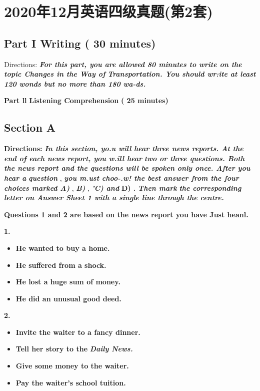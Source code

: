 \documentclass[UTF8,11pt]{ctexart}
\begin{document}
\section*{2020年12月英语四级真题(第2套)}
\subsection*{\textbf{Part I} \textbf{Writing} \textbf{( 30 minutes)}}


Directions: \textbf{\textit{For this part, you are allowed 80 minutes to write on the topic Changes in the Way of}} \textbf{\textit{Transportation. You should wr:ite at least 120 wonds but no more than 180 wa-ds.}}


\textbf{Part ll} \textbf{Listening Comprehension} \textbf{( 25 minutes)}


\subsection*{Section A}


\textbf{Directions: }\textbf{\textit{In this section, yo.u will hear three news reports. At the end of each news report, you w.ill hear}} \textbf{\textit{two or three questions. Both the news report and the questions will be spoken only once. After you hear a}} \textbf{\textit{question }}, \textbf{\textit{you m.ust choo-.w! the best answer from the four choices marked A) }}, \textbf{\textit{B) }}, \textbf{\textit{'C) and }}\textbf{D) . }\textbf{\textit{Then mark}} \textbf{\textit{the corresponding letter on Answer Sheet 1 with a single line through the centre.}}


\textbf{Questions 1 and 2 are based on the news report you have Just heanl.}


\textbf{1.}


\begin{itemize}[leftmargin=2em,itemsep=.2em,topsep=.4em]\item[A.] \textbf{He wanted to buy a home.}
\item[B.] \textbf{He suffered from a shock.}
\item[C.] \textbf{He lost a huge sum of money.}
\item[D.] \textbf{He did an unusual good deed.}
\end{itemize}

\textbf{2.}


\begin{itemize}[leftmargin=2em,itemsep=.2em,topsep=.4em]\item[A.] \textbf{Invite the waiter to a fancy dinner.}
\item[B.] \textbf{Tell her story to the }\textbf{\textit{Daily News.}}
\item[C.] \textbf{Give some money to the waiter.}
\item[D.] \textbf{Pay the waiter's school tuition.}
\end{itemize}
\end{document}
